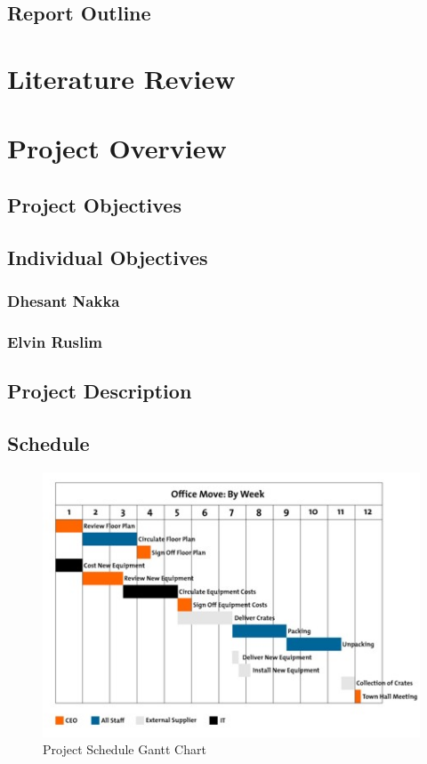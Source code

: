 \documentclass[12pt,a4paper,titlepage]{article}
\begin{document}
\subsection{Report Outline}
\blindtext

\section{Literature Review}\label{sec:lit_review}
\Blindtext

\section{Project Overview}\label{sec:overview}
\subsection{Project Objectives}
\blindtext
\subsection{Individual Objectives}
\subsubsection{Dhesant Nakka}
\blindtext
\subsubsection{Elvin Ruslim}
\blindtext
\subsection{Project Description}
\blindtext

\subsection{Schedule}
\blindtext
\begin{figure}[H]
  \centering
  \includegraphics[width=\textwidth]{images/gantt_chart.jpg}
  \caption{Project Schedule Gantt Chart}
\end{figure}
\end{document}
